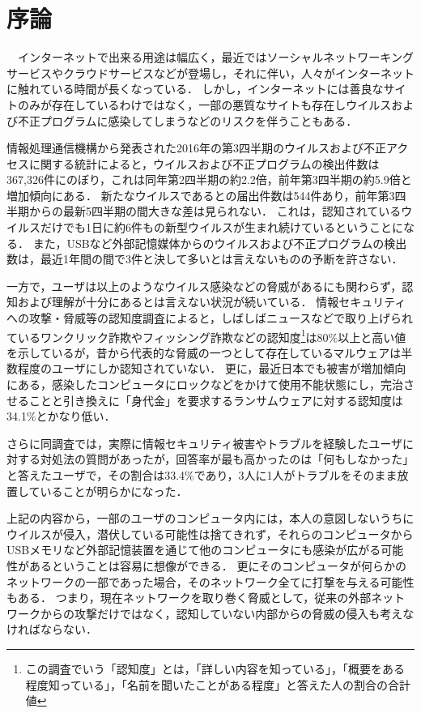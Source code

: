 \chapter{序論}

　インターネットで出来る用途は幅広く，最近ではソーシャルネットワーキングサービスやクラウドサービスなどが登場し，それに伴い，人々がインターネットに触れている時間が長くなっている．
しかし，インターネットには善良なサイトのみが存在しているわけではなく，一部の悪質なサイトも存在しウイルスおよび不正プログラムに感染してしまうなどのリスクを伴うこともある．

情報処理通信機構から発表された2016年の第3四半期のウイルスおよび不正アクセスに関する統計によると，ウイルスおよび不正プログラムの検出件数は367,326件にのぼり，これは同年第2四半期の約2.2倍，前年第3四半期の約5.9倍と増加傾向にある\cite{joron2}．
新たなウイルスであるとの届出件数は544件あり，前年第3四半期からの最新5四半期の間大きな差は見られない．
これは，認知されているウイルスだけでも1日に約6件もの新型ウイルスが生まれ続けているということになる．
また，USBなど外部記憶媒体からのウイルスおよび不正プログラムの検出数は，最近1年間の間で3件と決して多いとは言えないものの予断を許さない．

一方で，ユーザは以上のようなウイルス感染などの脅威があるにも関わらず，認知および理解が十分にあるとは言えない状況が続いている．
情報セキュリティへの攻撃・脅威等の認知度調査\cite{joron1}によると，しばしばニュースなどで取り上げられているワンクリック詐欺やフィッシング詐欺などの認知度\footnote{この調査でいう「認知度」とは，「詳しい内容を知っている」，「概要をある程度知っている」，「名前を聞いたことがある程度」と答えた人の割合の合計値}は80\%以上と高い値を示しているが，昔から代表的な脅威の一つとして存在しているマルウェアは半数程度のユーザにしか認知されていない．
更に，最近日本でも被害が増加傾向にある，感染したコンピュータにロックなどをかけて使用不能状態にし，完治させることと引き換えに「身代金」を要求するランサムウェア\cite{ransomware}に対する認知度は34.1\%とかなり低い．

さらに同調査では，実際に情報セキュリティ被害やトラブルを経験したユーザに対する対処法の質問があったが，回答率が最も高かったのは「何もしなかった」と答えたユーザで，その割合は33.4\%であり，3人に1人がトラブルをそのまま放置していることが明らかになった\cite{joron1}．

上記の内容から，一部のユーザのコンピュータ内には，本人の意図しないうちにウイルスが侵入，潜伏している可能性は捨てきれず，それらのコンピュータからUSBメモリなど外部記憶装置を通じて他のコンピュータにも感染が広がる可能性があるということは容易に想像ができる．
更にそのコンピュータが何らかのネットワークの一部であった場合，そのネットワーク全てに打撃を与える可能性もある．
つまり，現在ネットワークを取り巻く脅威として，従来の外部ネットワークからの攻撃だけではなく，認知していない内部からの脅威の侵入も考えなければならない．

